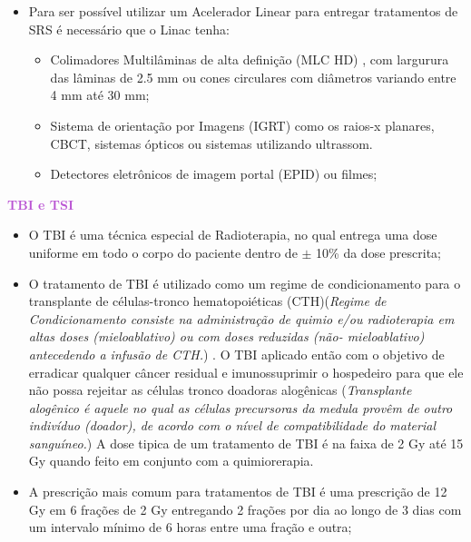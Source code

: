 \documentclass[11pt,a4paper]{article}
\newcounter{exemplo}
\begin{document}
\begin{exemplo}
\begin{itemize}
        \item Para ser possível utilizar um Acelerador Linear para entregar tratamentos de SRS é necessário que o Linac tenha:
        
            \begin{itemize}[label=\textcolor{CarnationPink}{$\blacktriangleright$}]
                \item Colimadores Multilâminas de alta definição (MLC HD) , com largurura das lâminas de 2.5 mm ou cones circulares com diâmetros variando entre 4 mm até 30 mm;
                \item Sistema de orientação por Imagens (IGRT) como os raios-x planares, CBCT, sistemas ópticos ou sistemas utilizando ultrassom.
                \item Detectores eletrônicos de imagem portal (EPID) ou filmes;
            \end{itemize}

    \end{itemize}

    \textcolor{MediumOrchid}{\LobsterTwo\textbf{TBI e TSI}}
    \begin{itemize}
        \item O TBI é uma técnica especial de Radioterapia, no qual entrega uma dose uniforme em todo o corpo do paciente dentro de $\pm$ 10\% da dose prescrita;
        
        \item O tratamento de TBI é utilizado como um regime de condicionamento para o transplante de células-tronco hematopoiéticas (CTH)(\textit{Regime de Condicionamento consiste na administração de quimio e/ou radioterapia em altas doses (mieloablativo) ou com doses reduzidas (não- mieloablativo) antecedendo a infusão de CTH.}) . O TBI aplicado então com o objetivo de erradicar qualquer câncer residual e imunossuprimir o hospedeiro para que ele não possa rejeitar as células tronco doadoras alogênicas (\textit{Transplante alogênico é aquele no qual as células precursoras da medula provêm de outro indivíduo (doador), de acordo com o nível de compatibilidade do material sanguíneo.})  A dose tipica de  um tratamento de TBI é na faixa de 2 Gy até 15 Gy quando feito em conjunto com a quimiorerapia.
        
        \item A prescrição mais comum para tratamentos de TBI é uma prescrição de 12 Gy em 6 frações de 2 Gy entregando 2 frações por dia  ao longo de 3 dias com um intervalo mínimo de 6 horas entre uma fração e outra;
        

\end{itemize}
\end{exemplo}
\end{document}
